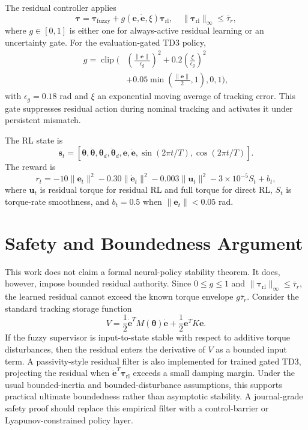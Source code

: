 \documentclass[reprint,amsmath,amssymb,aps,pra]{revtex4-2}
\begin{document}
The residual controller applies
\begin{equation}
    \bm{\tau} = \bm{\tau}_{\mathrm{fuzzy}} + g(\bm{e},\dot{\bm{e}},\xi)\bm{\tau}_{\mathrm{rl}},
    \quad
    \|\bm{\tau}_{\mathrm{rl}}\|_{\infty}\leq \bar{\tau}_r ,
\end{equation}
where $g\in[0,1]$ is either one for always-active residual learning or an uncertainty gate. For the evaluation-gated TD3 policy,
\begin{equation}
    \begin{aligned}
    g = \operatorname{clip}\bigg(&
    \left(\frac{\|\bm{e}\|}{\epsilon_g}\right)^2
    +0.2\left(\frac{\xi}{\epsilon_g}\right)^2 \\
    &+0.05\min\left(\frac{\|\dot{\bm{e}}\|}{2},1\right),0,1\bigg),
    \end{aligned}
\end{equation}
with $\epsilon_g=0.18$ rad and $\xi$ an exponential moving average of tracking error. This gate suppresses residual action during nominal tracking and activates it under persistent mismatch.

The RL state is
\begin{equation}
    \bm{s}_t=[\bm{\theta},\dot{\bm{\theta}},\bm{\theta}_d,\dot{\bm{\theta}}_d,\bm{e},\dot{\bm{e}},\sin(2\pi t/T),\cos(2\pi t/T)].
\end{equation}
The reward is
\begin{equation}
    r_t =
    -10\|\bm{e}_t\|^2
    -0.30\|\dot{\bm{e}}_t\|^2
    -0.003\|\bm{u}_t\|^2
    -3\times10^{-5}S_t
    + b_t ,
\end{equation}
where $\bm{u}_t$ is residual torque for residual RL and full torque for direct RL, $S_t$ is torque-rate smoothness, and $b_t=0.5$ when $\|\bm{e}_t\|<0.05$ rad.

\section{Safety and Boundedness Argument}

This work does not claim a formal neural-policy stability theorem. It does, however, impose bounded residual authority. Since $0\leq g\leq1$ and $\|\bm{\tau}_{\mathrm{rl}}\|_{\infty}\leq\bar{\tau}_r$, the learned residual cannot exceed the known torque envelope $g\bar{\tau}_r$. Consider the standard tracking storage function
\begin{equation}
    V=\frac{1}{2}\dot{\bm{e}}^T M(\bm{\theta})\dot{\bm{e}}+\frac{1}{2}\bm{e}^T K\bm{e}.
\end{equation}
If the fuzzy supervisor is input-to-state stable with respect to additive torque disturbances, then the residual enters the derivative of $V$ as a bounded input term. A passivity-style residual filter is also implemented for trained gated TD3, projecting the residual when $\dot{\bm{e}}^T\bm{\tau}_{\mathrm{rl}}$ exceeds a small damping margin. Under the usual bounded-inertia and bounded-disturbance assumptions, this supports practical ultimate boundedness rather than asymptotic stability. A journal-grade safety proof should replace this empirical filter with a control-barrier or Lyapunov-constrained policy layer.
\end{document}
